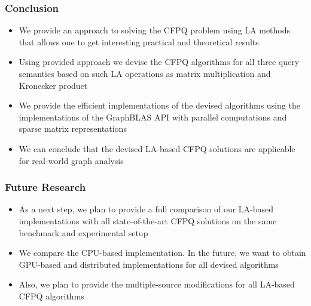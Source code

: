 \documentclass[xcolor=table,aspectratio=169]{beamer}
\begin{document}
\begin{frame}[fragile] \frametitle{Conclusion}
  \begin{itemize}
    \item We provide an approach to solving the CFPQ
    problem using LA methods that allows one to get interesting practical and theoretical results
    \item Using provided approach we devise the CFPQ algorithms for all three query semantics based on such LA operations as matrix multiplication and Kronecker product
    \pause
    \item We provide the efficient implementations of the devised algorithms using the implementations of the GraphBLAS API with parallel computations and sparse matrix representations
    \pause
    \item We can conclude that the devised LA-based CFPQ solutions are applicable for real-world graph analysis
  \end{itemize}
    
    
\end{frame}

\begin{frame}[fragile] \frametitle{Future Research}
  \begin{itemize}
  	\item As a next step, we plan to provide a full comparison of our LA-based implementations with all state-of-the-art CFPQ solutions on the same benchmark and experimental setup
  	\item We compare the CPU-based implementation. In the future, we
  	want to obtain GPU-based and distributed implementations for all devised algorithms
    \item Also, we plan to provide the multiple-source
    modifications for all LA-based CFPQ algorithms
\end{itemize}
\end{frame}
\end{document}
